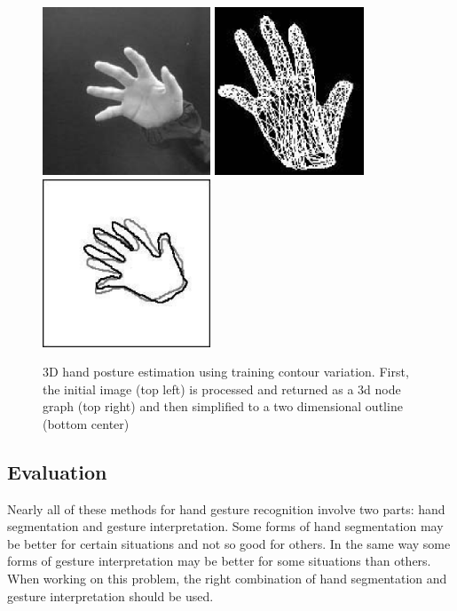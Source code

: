 \documentclass[a4paper,12pt]{report}
\begin{document}
\begin{figure}
\centering
\includegraphics[height=50mm]{3d1.eps}
\includegraphics[height=50mm]{3d2.eps}
\includegraphics[height=50mm]{3d3.eps}
\caption{3D hand posture estimation using training contour variation. First, the initial image (top left) is processed and returned as a 3d node graph (top right) and then simplified to a two dimensional outline (bottom center)}
\end{figure}



\subsection{Evaluation}
Nearly all of these methods for hand gesture recognition involve two parts: hand segmentation and gesture interpretation.  Some forms of hand segmentation may be better for certain situations and not so good for others. In the same way some forms of gesture interpretation may be better for some situations than others. When working on this problem, the right combination of hand segmentation and gesture interpretation should be used.   
\end{document}
